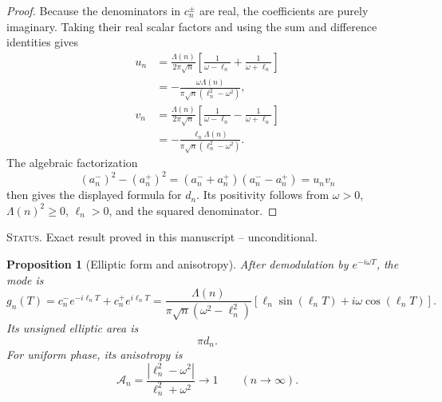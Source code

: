 \documentclass[11pt]{amsart}
\numberwithin{equation}{section}
\theoremstyle{plain}
\newtheorem{proposition}[theorem]{Proposition}
\theoremstyle{definition}
\theoremstyle{remark}
\newcommand{\1}{\mathbf{1}}
\newcommand{\statusnote}[1]{%
  \par\smallskip\noindent
  \begingroup\footnotesize\textsc{Status.} #1\endgroup
  \par\smallskip}
\begin{document}
\begin{proof}
Because the denominators in \(c_n^\pm\) are real, the coefficients are
purely imaginary.  Taking their real scalar factors and using the sum and
difference identities gives
\begin{align}
u_n
&=
\frac{\Lambda(n)}{2\pi\sqrt n}
\left[
\frac1{\omega-\ell_n}+\frac1{\omega+\ell_n}
\right]
\label{eq:un_proof_one}
\\
&=
-\frac{\omega\Lambda(n)}
{\pi\sqrt n(\ell_n^2-\omega^2)},
\label{eq:un_proof_two}
\\
v_n
&=
\frac{\Lambda(n)}{2\pi\sqrt n}
\left[
\frac1{\omega-\ell_n}-\frac1{\omega+\ell_n}
\right]
\label{eq:vn_proof_one}
\\
&=
-\frac{\ell_n\Lambda(n)}
{\pi\sqrt n(\ell_n^2-\omega^2)}.
\label{eq:vn_proof_two}
\end{align}
The algebraic factorization
\begin{equation}
(a_n^-)^2-(a_n^+)^2
=
(a_n^-+a_n^+)(a_n^--a_n^+)
=u_nv_n
\label{eq:dn_difference_squares}
\end{equation}
then gives the displayed formula for \(d_n\).  Its positivity follows
from \(\omega>0\), \(\Lambda(n)^2\geq0\), \(\ell_n>0\), and the squared
denominator.
\end{proof}

\statusnote{Exact result proved in this manuscript -- unconditional.}
\begin{proposition}[Elliptic form and anisotropy]
\label{prop:ellipse_anisotropy}
After demodulation by \(e^{-i\omega T}\), the mode is
\begin{equation}
g_n(T)
=
c_n^-e^{-i\ell_nT}
+
c_n^+e^{i\ell_nT}
=
\frac{\Lambda(n)}
{\pi\sqrt n(\omega^2-\ell_n^2)}
\left[
\ell_n\sin(\ell_nT)
+
i\omega\cos(\ell_nT)
\right].
\label{eq:gn_ellipse}
\end{equation}
Its unsigned elliptic area is
\begin{equation}
\pi d_n.
\label{eq:ellipse_area}
\end{equation}
For uniform phase, its anisotropy is
\begin{equation}
\mathcal A_n
=
\frac{|\ell_n^2-\omega^2|}{\ell_n^2+\omega^2}
\longrightarrow1
\qquad(n\to\infty).
\label{eq:single_mode_anisotropy}
\end{equation}
\end{proposition}
\end{document}
